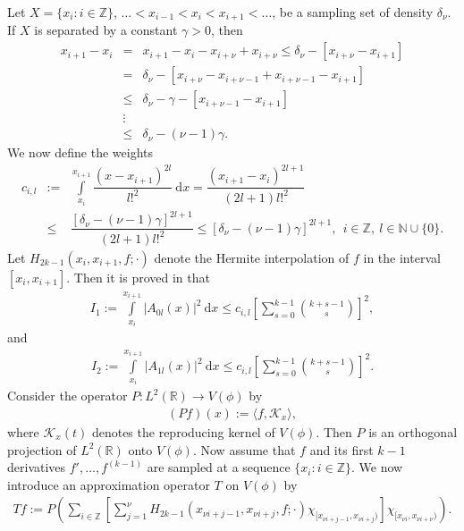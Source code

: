 \documentclass[a4paper,12pt,reqno]{amsart}
\theoremstyle{plain}
\numberwithin{equation}{section}
\theoremstyle{definition}
\newcommand{\ds}{\displaystyle}
\begin{document}
Let $X=\{x_i:i\in\mathbb{Z}\}$, $\dots<x_{i-1}<x_i<x_{i+1}<\dots$, be a sampling set of density $\delta_\nu$.
If $X$ is separated by a constant $\gamma>0$, then
\begin{eqnarray}\label{pap7eqn3.3}
 x_{i+1}-x_i&=&x_{i+1}-x_i-x_{i+\nu}+x_{i+\nu}
 \leq\delta_\nu-[x_{i+\nu}-x_{i+1}]\nonumber\\
 &=&\delta_\nu-[x_{i+\nu}-x_{i+\nu-1}+x_{i+\nu-1}-x_{i+1}]\nonumber\\
 &\leq&\delta_\nu-\gamma-[x_{i+\nu-1}-x_{i+1}]\nonumber\\
 &\vdots&\nonumber\\
 &\leq&\delta_\nu-(\nu-1)\gamma.
\end{eqnarray}
We now define the weights
\begin{eqnarray}\label{pap7eqn3.4}
c_{i,l}&:=&\int\limits_{x_i}^{x_{i+1}}\dfrac{(x-x_{i+1})^{2l}}{l!^2}~\mathrm{d}x
=\dfrac{(x_{i+1}-x_i)^{2l+1}}{(2l+1)l!^2}\nonumber\\
&\leq&\dfrac{[\delta_\nu-(\nu-1)\gamma]^{2l+1}}{(2l+1)l!^2}
\leq[\delta_\nu-(\nu-1)\gamma]^{2l+1},~~i\in\mathbb{Z},~l\in \mathbb{N}\cup\{0\}.
\end{eqnarray}
Let $H_{2k-1}(x_i,x_{i+1},f;\cdot)$ denote the Hermite interpolation of $f$ in the interval $[x_i,x_{i+1}]$. Then 
it is proved in \cite{AntoRad2} that  
\begin{eqnarray}\label{pap7eqn3.5}
I_1:=\ds\int\limits_{x_i}^{x_{i+1}}|A_{0l}(x)|^2~\mathrm{d}x\leq c_{i,l}\left[\ds\sum\limits_{s=0}^{k-1}{k+s-1\choose s}\right]^2,
\end{eqnarray}
and
\begin{eqnarray}\label{pap7eqn3.6}
I_2:=\ds\int\limits_{x_i}^{x_{i+1}}|A_{1l}(x)|^2~\mathrm{d}x\leq c_{i,l}\left[\ds\sum\limits_{s=0}^{k-1}{k+s-1\choose s}\right]^2.
\end{eqnarray}
Consider  the operator $P:L^2(\mathbb{R})\to V(\phi)$ by
\begin{eqnarray}
(Pf)(x):=\langle f, \mathcal{K}_x\rangle,
\end{eqnarray}
where $\mathcal{K}_x(t)$ denotes the reproducing kernel of $V(\phi)$. Then $P$ is an orthogonal projection of $L^2(\mathbb{R})$ onto $V(\phi)$.
Now assume that $f$ and its first $k-1$ derivatives $f', \dots,f^{(k-1)}$ are sampled at a sequence $\{x_i:{i\in\mathbb{Z}}\}$.
We now introduce an approximation operator $T$ on $V(\phi)$ by
\begin{align*}
Tf:=P\left(\sum\limits_{i\in\mathbb{Z}}\left[\sum\limits_{j=1}^{\nu}H_{2k-1}(x_{\nu i+j-1},x_{\nu i+j},f;\cdot)\chi_{[x_{\nu i+j-1},x_{\nu i+j})}\right]\chi_{[x_{\nu i},x_{\nu i+\nu})}\right).
\end{align*}
\end{document}
